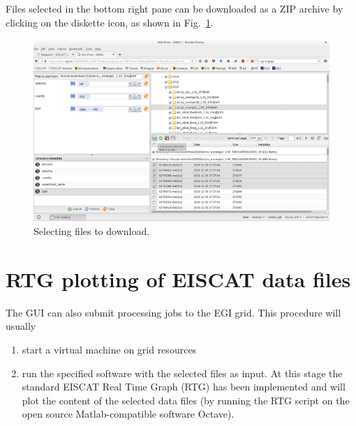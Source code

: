 \documentclass[a4paper]{article}
\begin{document}
Files selected in the bottom right pane can be downloaded as a ZIP
archive by clicking on the diskette icon, as shown in
Fig.~\ref{fig:download}.
\begin{figure}[htb]
  \centering
  \includegraphics[width=1.0\linewidth]{dirac-gui-download}
  \caption{Selecting files to download.}
  \label{fig:download}
\end{figure}

\section{RTG plotting of EISCAT data files}
\label{sec:rtg}

The GUI can also submit processing jobs to the EGI grid. This procedure will usually

\begin{enumerate}
\item start a virtual machine on grid resources

\item run the specified software with the selected files as input. At
  this stage the standard EISCAT Real Time Graph (RTG) has been
  implemented and will plot the content of the selected data files (by
  running the RTG script on the open source Matlab-compatible software
  Octave).

\end{enumerate}
\end{document}
